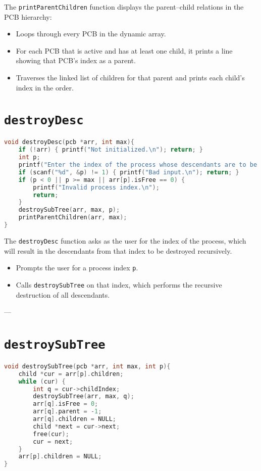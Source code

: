\documentclass[12pt]{article}
\begin{document}
The \texttt{printParentChildren} function displays the parent--child relations 
in the PCB hierarchy:

\begin{itemize}
  \item Loops through every PCB in the dynamic array.
  \item For each PCB that is active and has at least one child, 
  it prints a line showing that PCB’s index as a parent.
  \item Traverses the linked list of children for that parent and prints each child’s index 
  in the order.
  
\end{itemize}


\newpage


\section*{\texttt{destroyDesc}}
\begin{lstlisting}[language=C]
void destroyDesc(pcb *arr, int max){
    if (!arr) { printf("Not initialized.\n"); return; }
    int p;
    printf("Enter the index of the process whose descendants are to be destroyed: ");
    if (scanf("%d", &p) != 1) { printf("Bad input.\n"); return; }
    if (p < 0 || p >= max || arr[p].isFree == 0) {
        printf("Invalid process index.\n");
        return;
    }
    destroySubTree(arr, max, p);
    printParentChildren(arr, max);
}
\end{lstlisting}

The \texttt{destroyDesc} function asks as the user for the index of the process, which will result in the descendants from that index to be destroyed recursively.
\begin{itemize}
   \item Prompts the user for a process index \texttt{p}.
   \item Calls \texttt{destroySubTree} on that index, which performs the recursive destruction of all descendants.
 
\end{itemize}

---


\section*{\texttt{destroySubTree}}
\begin{lstlisting}[language=C]
void destroySubTree(pcb *arr, int max, int p){
    child *cur = arr[p].children;
    while (cur) {
        int q = cur->childIndex;
        destroySubTree(arr, max, q);
        arr[q].isFree = 0;
        arr[q].parent = -1;
        arr[q].children = NULL;
        child *next = cur->next;
        free(cur);
        cur = next;
    }
    arr[p].children = NULL;
}
\end{lstlisting}
\end{document}
